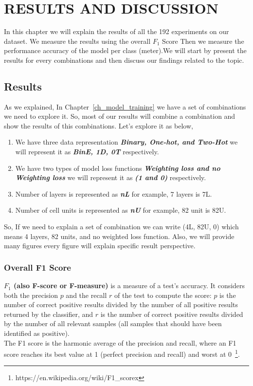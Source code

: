 \chapter{\uppercase{Results And Discussion}}\label{ch_results}

In this chapter we will explain the results of all the 192 experiments on our dataset. We measure the results using the overall $F_1$ Score Then we measure the performance accuracy of the model per class (meter).We will start by present the results for every combinations and then discuss our findings related to the topic.

\section{Results}

As we explained, In Chapter~\ref{ch_model_training} we have a set of combinations we need to explore it. So, most of our results will combine a combination and show the results of this combinations. Let's explore it as below,
\begin{enumerate}
\item  We have three data representation \textbf{\textit{Binary, One-hot, and Two-Hot}} we will represent it as \textbf{\textit{BinE, 1D, 0T}} respectively.
\item We have two types of model loss functions \textbf{\textit{Weighting loss and no Weighting loss}} we will represent it as \textbf{\textit{(1 and 0)}} respectively.
\item Number of layers is represented as \textbf{\textit{nL}} for example, 7 layers is 7L.
  \item Number of cell units is represented as \textbf{\textit{nU}} for example, 82 unit is 82U.
  \end{enumerate}

  So, If we need to explain a set of combination we can write (4L, 82U, 0) which means 4 layers, 82 units, and no weighted loss function. Also, we will provide many figures every figure will explain specific result perspective.
  
\subsection{Overall F1 Score}

\textbf{$F_1$ (also F-score or F-measure)} is a measure of a test's accuracy. It considers both the precision $p$ and the recall $r$ of the test to compute the score: $p$ is the number of correct positive results divided by the number of all positive results returned by the classifier, and $r$ is the number of correct positive results divided by the number of all relevant samples (all samples that should have been identified as positive).\\ The F1 score is the harmonic average of the precision and recall, where an F1 score reaches its best value at 1 (perfect precision and recall) and worst at 0~\footnote{https://en.wikipedia.org/wiki/F1\_scorex}.
\newpage

